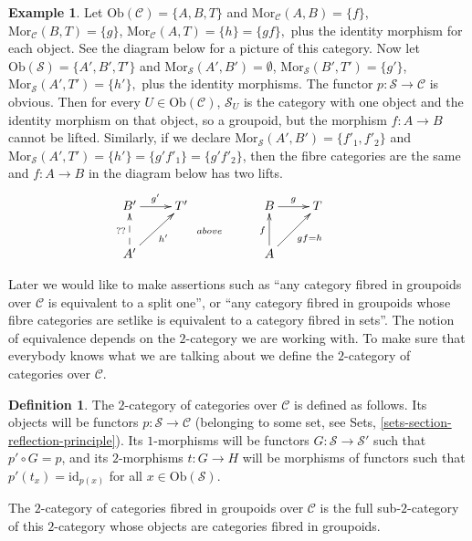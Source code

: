 \documentclass{amsart}
\theoremstyle{definition}
\newtheorem{definition}[theorem]{Definition}
\newtheorem{example}[theorem]{Example}
\theoremstyle{remark}
\numberwithin{equation}{subsection}
\begin{document}
\begin{example}
Let $ \text{Ob}(\mathcal{C}) = \{A,B,T\}$ and 
$\text{Mor}_\mathcal{C}(A,B) = \{f\}$, $\text{Mor}_\mathcal{C}(B,T) = \{g\}$,
$\text{Mor}_\mathcal{C}(A,T) = \{h\} = \{gf\},$ plus the identity morphism for 
each object. See the diagram below for a picture of this category. Now let 
$\text{Ob}(\mathcal{S}) = \{A',B',T'\}$ and 
$\text{Mor}_\mathcal{S}(A',B') = \emptyset$,  
$\text{Mor}_\mathcal{S}(B',T') = \{g'\}$,  
$\text{Mor}_\mathcal{S}(A',T') = \{h'\},$ plus the identity morphisms. The 
functor $p : \mathcal{S} \to \mathcal{C}$ is obvious. Then for every 
$U \in \text{Ob}(\mathcal{C})$, $\mathcal{S}_U$ is the category with one 
object and the identity morphism on that object, so a groupoid, but the 
morphism $f: A \to B$ cannot be lifted. Similarly, if we declare 
$\text{Mor}_\mathcal{S}(A',B') = \{f'_1, f'_2\}$ and 
$ \text{Mor}_\mathcal{S}(A',T') = \{h'\} = \{g'f'_1 \} = \{g'f'_2\}$, then 
the fibre categories are the same and $f: A \to B$ in the diagram below has 
two lifts. 
$$
\xymatrix{
B' \ar[r]^{g'} & T' &  & B \ar[r]^g & T & \\
A' \ar@{-->}[u]^{??} \ar[ru]_{h'} & & \ar@{}[u]^{above} &
A \ar[u]^f \ar[ru]_{gf = h} & \\
}
$$ 
\end{example}

\noindent
Later we would like to make assertions such as ``any category fibred in
groupoids over $\mathcal{C}$ is equivalent to a split one'', or
``any category fibred in groupoids whose fibre categories are setlike
is equivalent to a category fibred in sets''. The notion of equivalence
depends on the $2$-category we are working with. To make sure
that everybody knows what we are talking about we define the
$2$-category of categories over $\mathcal{C}$.

\begin{definition}
\label{definition-categories-over-C}
The $2$-category of categories over $\mathcal{C}$ is defined
as follows. Its objects will be functors 
$p : \mathcal{S} \to \mathcal{C}$ (belonging to
some set, see Sets, \autoref{sets-section-reflection-principle}). Its 
$1$-morphisms will be functors $G : \mathcal{S} \to \mathcal{S}'$
such that $p' \circ G = p$, and its $2$-morphisms $t : G \to H$
will be morphisms of functors such that $p'(t_x) = \text{id}_{p(x)}$
for all $x \in \text{Ob}(\mathcal{S})$.
\end{definition}

\noindent
The $2$-category of categories fibred in groupoids over $\mathcal{C}$
is the full sub-$2$-category of this $2$-category whose objects
are categories fibred in groupoids.
\end{document}
